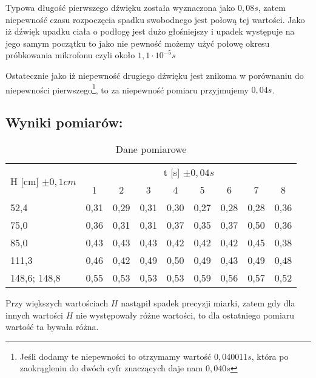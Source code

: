 \documentclass[a4paper,12pt]{article}
\begin{document}
Typowa długość pierwszego dźwięku została wyznaczona jako $0,08s$, zatem
niepewność czasu rozpoczęcia spadku swobodnego jest połową tej wartości. Jako iż
dźwięk upadku ciała o podłogę jest dużo głośniejszy i upadek występuje na jego
samym początku to jako nie pewność możemy użyć połowę okresu próbkowania
mikrofonu czyli około $1,1 \cdot 10^{-5}s$

Ostatecznie jako iż niepewność drugiego dźwięku jest znikoma w porównaniu do
niepewności pierwszego\footnote{Jeśli dodamy te niepewności to otrzymamy wartość
$0,040011s$, która po zaokrągleniu do dwóch cyfr znaczących daje nam $0,040s$},
to za niepewność pomiaru przyjmujemy $0,04s$.

\subsection*{Wyniki pomiarów:}

\begin{table}[h]
\centering
\begin{tabular}{|l|l|l|l|l|l|l|l|l|}
\hline
\multicolumn{1}{|c|}{\multirow{2}{*}{H [cm] $\pm 0,1cm$}} & \multicolumn{8}{c|}{t [s] $\pm 0,04s$}                \\ \cline{2-9} 
\multicolumn{1}{|c|}{} &
  \multicolumn{1}{c|}{1} &
  \multicolumn{1}{c|}{2} &
  \multicolumn{1}{c|}{3} &
  \multicolumn{1}{c|}{4} &
  \multicolumn{1}{c|}{5} &
  \multicolumn{1}{c|}{6} &
  \multicolumn{1}{c|}{7} &
  \multicolumn{1}{c|}{8} \\ \hline\hline
52,4                                                     & 0,31 & 0,29 & 0,31 & 0,30 & 0,27 & 0,28 & 0,28 & 0,36 \\ \hline
75,0                                                     & 0,36 & 0,31 & 0,31 & 0,37 & 0,35 & 0,37 & 0,50 & 0,36 \\ \hline
85,0                                                       & 0,43 & 0,43 & 0,43 & 0,42 & 0,42 & 0,42 & 0,45 & 0,38 \\ \hline
111,3                                                    & 0,46 & 0,42 & 0,49 & 0,50 & 0,49 & 0,43 & 0,49 & 0,48 \\ \hline
148,6; 148,8                                                    & 0,55 & 0,53 & 0,53 & 0,53 & 0,59 & 0,56 & 0,57 & 0,52 \\ \hline
\end{tabular}
\caption{Dane pomiarowe}
\label{tab:raw}
\end{table}

Przy większych wartościach $H$ nastąpił spadek precyzji miarki, zatem gdy dla
innych wartości $H$ nie występowały różne wartości, to dla ostatniego pomiaru
wartość ta bywała różna.
\end{document}
